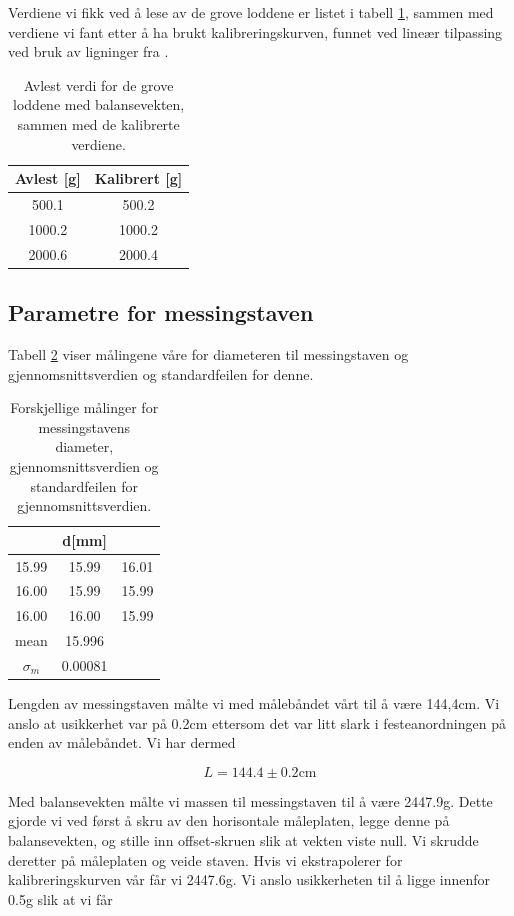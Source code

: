 \documentclass[a4paper,11pt, twocolumn]{article}
\begin{document}
Verdiene vi fikk ved å lese av de grove loddene er listet i tabell \ref{tab:kalibrert}, sammen med verdiene vi fant etter å ha brukt kalibreringskurven, funnet ved lineær tilpassing ved bruk av ligninger fra \cite[s. 39]{squires}.

\begin{table}[!ht]
\centering
\caption{Avlest verdi for de grove loddene med balansevekten, sammen med de kalibrerte verdiene.}
\label{tab:kalibrert}
\begin{tabular}{cc}
	\toprule
	\toprule
	Avlest [g] & Kalibrert [g]\\
	\hline
	500.1 & 500.2\\
	1000.2 & 1000.2\\
	2000.6 & 2000.4\\
	\toprule
\end{tabular}
\end{table}

\subsection{Parametre for messingstaven}
Tabell \ref{tab:diameter} viser målingene våre for diameteren til messingstaven og gjennomsnittsverdien og standardfeilen for denne.

\begin{table}[!ht]
\centering
\caption{Forskjellige målinger for messingstavens diameter, gjennomsnittsverdien og standardfeilen for gjennomsnittsverdien.}
\label{tab:diameter}
\begin{tabular}{ccc}
	\toprule
	\toprule
	 & d[mm]&\\
	\hline
	15.99 & 15.99 & 16.01\\
	16.00 & 15.99 & 15.99\\
	16.00 & 16.00 & 15.99\\
	\hline
	mean & 15.996 &\\
	$\sigma_m$ & 0.00081&\\
	\toprule
\end{tabular}
\end{table}

Lengden av messingstaven målte vi med målebåndet vårt til å være 144,4cm. Vi anslo at usikkerhet var på 0.2cm ettersom det var litt slark i festeanordningen på enden av målebåndet. Vi har dermed 

\begin{equation}
L=144.4\pm0.2\text{cm} 
\end{equation}

Med balansevekten målte vi massen til messingstaven til å være 2447.9g.  Dette gjorde vi ved først å skru av den horisontale måleplaten, legge denne på balansevekten, og stille inn offset-skruen slik at vekten viste null. Vi skrudde deretter på måleplaten og veide staven. Hvis vi ekstrapolerer for kalibreringskurven vår får vi 2447.6g. Vi anslo usikkerheten til å ligge innenfor 0.5g slik at vi får
\end{document}
